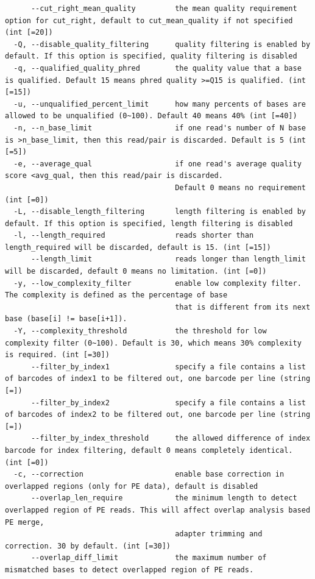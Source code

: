 \documentclass[
  letterpaper,
]{book}
\begin{document}
\begin{verbatim}
      --cut_right_mean_quality         the mean quality requirement option for cut_right, default to cut_mean_quality if not specified (int [=20])
  -Q, --disable_quality_filtering      quality filtering is enabled by default. If this option is specified, quality filtering is disabled
  -q, --qualified_quality_phred        the quality value that a base is qualified. Default 15 means phred quality >=Q15 is qualified. (int [=15])
  -u, --unqualified_percent_limit      how many percents of bases are allowed to be unqualified (0~100). Default 40 means 40% (int [=40])
  -n, --n_base_limit                   if one read's number of N base is >n_base_limit, then this read/pair is discarded. Default is 5 (int [=5])
  -e, --average_qual                   if one read's average quality score <avg_qual, then this read/pair is discarded.
                                       Default 0 means no requirement (int [=0])
  -L, --disable_length_filtering       length filtering is enabled by default. If this option is specified, length filtering is disabled
  -l, --length_required                reads shorter than length_required will be discarded, default is 15. (int [=15])
      --length_limit                   reads longer than length_limit will be discarded, default 0 means no limitation. (int [=0])
  -y, --low_complexity_filter          enable low complexity filter. The complexity is defined as the percentage of base
                                       that is different from its next base (base[i] != base[i+1]).
  -Y, --complexity_threshold           the threshold for low complexity filter (0~100). Default is 30, which means 30% complexity is required. (int [=30])
      --filter_by_index1               specify a file contains a list of barcodes of index1 to be filtered out, one barcode per line (string [=])
      --filter_by_index2               specify a file contains a list of barcodes of index2 to be filtered out, one barcode per line (string [=])
      --filter_by_index_threshold      the allowed difference of index barcode for index filtering, default 0 means completely identical. (int [=0])
  -c, --correction                     enable base correction in overlapped regions (only for PE data), default is disabled
      --overlap_len_require            the minimum length to detect overlapped region of PE reads. This will affect overlap analysis based PE merge,
                                       adapter trimming and correction. 30 by default. (int [=30])
      --overlap_diff_limit             the maximum number of mismatched bases to detect overlapped region of PE reads.

\end{verbatim}
\end{document}
